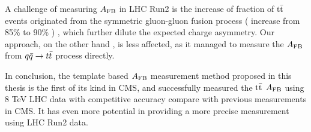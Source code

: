 A challenge of measuring $A_{\mathrm{FB}}$ in LHC Run2 is the increase of fraction of $\mathrm{t}\bar{\mathrm{t}}$ events originated from the symmetric gluon-gluon fusion process ( increase from 85\% to 90\% ) , which further dilute the expected charge asymmetry. Our approach, on the other hand , is less affected, as it managed to measure the $A_{\mathrm{FB}}$ from $q\bar q \rightarrow t \bar t$ process directly. 

In conclusion, the template based $A_{\mathrm{FB}}$ measurement method proposed in this thesis is the first of its kind in CMS, and successfully measured the $\mathrm{t}\bar{\mathrm{t}}$ $A_{\mathrm{FB}}$ using 8 TeV LHC data with competitive accuracy compare with previous measurements in CMS. It has even more potential in providing a more precise measurement using LHC Run2 data.